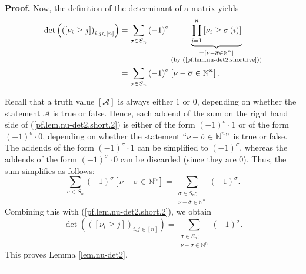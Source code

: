 \documentclass[numbers=enddot,12pt,final,onecolumn,notitlepage,english]{scrartcl}%
\theoremstyle{definition}
\newenvironment{proof}[1][Proof]{\noindent\textbf{#1.} }{\ \rule{0.5em}{0.5em}}
\let\sumnonlimits\sum
\let\prodnonlimits\prod
\renewcommand{\sum}{\sumnonlimits\limits}
\renewcommand{\prod}{\prodnonlimits\limits}
\newenvironment{vershort}{}{}
\begin{document}
\begin{vershort}
\begin{proof}
Now, the definition of the determinant of a matrix yields%
\begin{align}
\det\left(  \left(  \left[  \nu_{i}\geq j\right]  \right)  _{i,j\in\left[
n\right]  }\right)   &  =\sum_{\sigma\in S_{n}}\left(  -1\right)  ^{\sigma
}\underbrace{\prod_{i=1}^{n}\left[  \nu_{i}\geq\sigma\left(  i\right)
\right]  }_{\substack{=\left[  \nu-\overline{\sigma}\in\mathbb{N}^{n}\right]
\\\text{(by (\ref{pf.lem.nu-det2.short.ive}))}}}\nonumber\\
&  =\sum_{\sigma\in S_{n}}\left(  -1\right)  ^{\sigma}\left[  \nu
-\overline{\sigma}\in\mathbb{N}^{n}\right]  . \label{pf.lem.nu-det2.short.2}%
\end{align}


Recall that a truth value $\left[  \mathcal{A}\right]  $ is always either $1$
or $0$, depending on whether the statement $\mathcal{A}$ is true or false.
Hence, each addend of the sum on the right hand side of
(\ref{pf.lem.nu-det2.short.2}) is either of the form $\left(  -1\right)
^{\sigma}\cdot1$ or of the form $\left(  -1\right)  ^{\sigma}\cdot0$,
depending on whether the statement \textquotedblleft$\nu-\overline{\sigma}%
\in\mathbb{N}^{n}$\textquotedblright\ is true or false. The addends of the
form $\left(  -1\right)  ^{\sigma}\cdot1$ can be simplified to $\left(
-1\right)  ^{\sigma}$, whereas the addends of the form $\left(  -1\right)
^{\sigma}\cdot0$ can be discarded (since they are $0$). Thus, the sum
simplifies as follows:%
\[
\sum_{\sigma\in S_{n}}\left(  -1\right)  ^{\sigma}\left[  \nu-\overline
{\sigma}\in\mathbb{N}^{n}\right]  =\sum_{\substack{\sigma\in S_{n}%
;\\\nu-\overline{\sigma}\in\mathbb{N}^{n}}}\left(  -1\right)  ^{\sigma}.
\]
Combining this with (\ref{pf.lem.nu-det2.short.2}), we obtain
\[
\det\left(  \left(  \left[  \nu_{i}\geq j\right]  \right)  _{i,j\in\left[
n\right]  }\right)  =\sum_{\substack{\sigma\in S_{n};\\\nu-\overline{\sigma
}\in\mathbb{N}^{n}}}\left(  -1\right)  ^{\sigma}.
\]
This proves Lemma \ref{lem.nu-det2}.
\end{proof}
\end{vershort}
\end{document}
